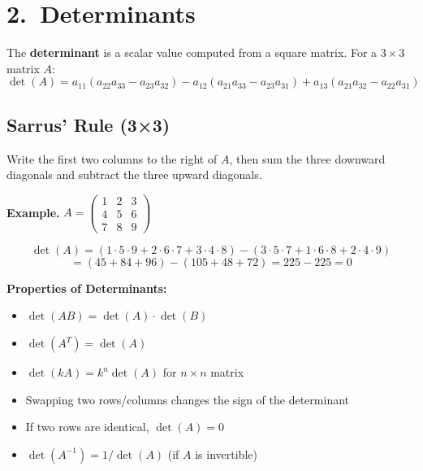 \documentclass[12pt]{article}
\begin{document}
\section{2.\ Determinants}

\begin{defbox}[Determinant]
The \textbf{determinant} is a scalar value computed from a square matrix. For a $3\times3$ matrix $A$:
\[
\det(A) = a_{11}(a_{22}a_{33}-a_{23}a_{32}) - a_{12}(a_{21}a_{33}-a_{23}a_{31}) + a_{13}(a_{21}a_{32}-a_{22}a_{31})
\]
\end{defbox}

\subsection{Sarrus' Rule (3×3)}

\begin{keybox}
Write the first two columns to the right of $A$, then sum the three downward diagonals and subtract the three upward diagonals.
\end{keybox}

\textbf{Example.} $A = \begin{pmatrix}1&2&3\\4&5&6\\7&8&9\end{pmatrix}$

\[
\det(A) = (1\cdot5\cdot9 + 2\cdot6\cdot7 + 3\cdot4\cdot8) - (3\cdot5\cdot7 + 1\cdot6\cdot8 + 2\cdot4\cdot9)
\]
\[
= (45 + 84 + 96) - (105 + 48 + 72) = 225 - 225 = 0
\]

\begin{formulabox}
\textbf{Properties of Determinants:}
\begin{itemize}[leftmargin=14pt, itemsep=3pt]
  \item $\det(AB) = \det(A)\cdot\det(B)$
  \item $\det(A^T) = \det(A)$
  \item $\det(kA) = k^n\det(A)$ for $n\times n$ matrix
  \item Swapping two rows/columns changes the sign of the determinant
  \item If two rows are identical, $\det(A) = 0$
  \item $\det(A^{-1}) = 1/\det(A)$ (if $A$ is invertible)
\end{itemize}
\end{formulabox}
\end{document}
